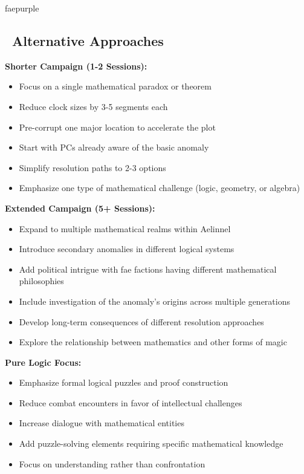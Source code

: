 \documentclass[11pt]{article}
\begin{document}
\begin{campaignsection}{faepurple}
\subsection*{\faRandom\ Alternative Approaches}

\textbf{Shorter Campaign (1-2 Sessions):}
\begin{itemize}
    \item Focus on a single mathematical paradox or theorem
    \item Reduce clock sizes by 3-5 segments each
    \item Pre-corrupt one major location to accelerate the plot
    \item Start with PCs already aware of the basic anomaly
    \item Simplify resolution paths to 2-3 options
    \item Emphasize one type of mathematical challenge (logic, geometry, or algebra)
\end{itemize}

\textbf{Extended Campaign (5+ Sessions):}
\begin{itemize}
    \item Expand to multiple mathematical realms within Aelinnel
    \item Introduce secondary anomalies in different logical systems
    \item Add political intrigue with fae factions having different mathematical philosophies
    \item Include investigation of the anomaly's origins across multiple generations
    \item Develop long-term consequences of different resolution approaches
    \item Explore the relationship between mathematics and other forms of magic
\end{itemize}

\textbf{Pure Logic Focus:}
\begin{itemize}
    \item Emphasize formal logical puzzles and proof construction
    \item Reduce combat encounters in favor of intellectual challenges
    \item Increase dialogue with mathematical entities
    \item Add puzzle-solving elements requiring specific mathematical knowledge
    \item Focus on understanding rather than confrontation
\end{itemize}


\end{campaignsection}
\end{document}
